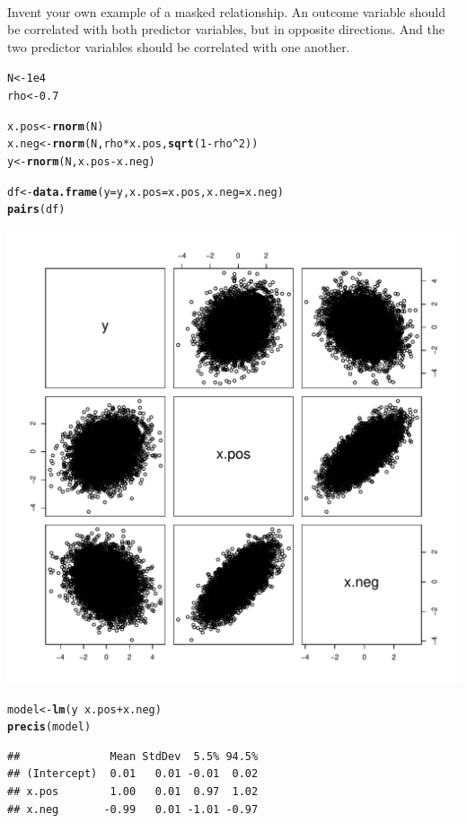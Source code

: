 \documentclass[12pt]{article}\usepackage[]{graphicx}\usepackage[]{color}
\makeatletter
\def\maxwidth{ %
  \ifdim\Gin@nat@width>\linewidth
    \linewidth
  \else
    \Gin@nat@width
  \fi
}
\newcommand{\hlnum}[1]{\textcolor[rgb]{0.686,0.059,0.569}{#1}}%
\newcommand{\hlopt}[1]{\textcolor[rgb]{0,0,0}{#1}}%
\newcommand{\hlstd}[1]{\textcolor[rgb]{0.345,0.345,0.345}{#1}}%
\newcommand{\hlkwb}[1]{\textcolor[rgb]{0.69,0.353,0.396}{#1}}%
\newcommand{\hlkwc}[1]{\textcolor[rgb]{0.333,0.667,0.333}{#1}}%
\newcommand{\hlkwd}[1]{\textcolor[rgb]{0.737,0.353,0.396}{\textbf{#1}}}%
\newenvironment{kframe}{%
 \def\at@end@of@kframe{}%
 \ifinner\ifhmode%
  \def\at@end@of@kframe{\end{minipage}}%
  \begin{minipage}{\columnwidth}%
 \fi\fi%
 \def\FrameCommand##1{\hskip\@totalleftmargin \hskip-\fboxsep
 \colorbox{shadecolor}{##1}\hskip-\fboxsep
     \hskip-\linewidth \hskip-\@totalleftmargin \hskip\columnwidth}%
 \MakeFramed {\advance\hsize-\width
   \@totalleftmargin\z@ \linewidth\hsize
   \@setminipage}}%
 {\par\unskip\endMakeFramed%
 \at@end@of@kframe}
\newenvironment{knitrout}{}{} %
\newenvironment{problem}[2][Problem]{\begin{trivlist}
\item[\hskip \labelsep {\bfseries #1}\hskip \labelsep {\bfseries #2.}]}{\end{trivlist}}
\makeatother
\begin{document}
\begin{problem}{5M2}
\text{ }\\
Invent your own example of a masked relationship. An outcome variable should be correlated with both predictor variables, but in opposite directions. And the two predictor variables should be correlated with one another.
\end{problem}

\begin{knitrout}
\color{fgcolor}\begin{kframe}
\begin{alltt}
\hlstd{N} \hlkwb{<-} \hlnum{1e4}
\hlstd{rho} \hlkwb{<-} \hlnum{0.7}

\hlstd{x.pos} \hlkwb{<-} \hlkwd{rnorm}\hlstd{(N)}
\hlstd{x.neg} \hlkwb{<-} \hlkwd{rnorm}\hlstd{(N, rho}\hlopt{*}\hlstd{x.pos,} \hlkwd{sqrt}\hlstd{(}\hlnum{1}\hlopt{-}\hlstd{rho}\hlopt{^}\hlnum{2}\hlstd{))}
\hlstd{y} \hlkwb{<-} \hlkwd{rnorm}\hlstd{(N, x.pos} \hlopt{-} \hlstd{x.neg)}

\hlstd{df} \hlkwb{<-} \hlkwd{data.frame}\hlstd{(}\hlkwc{y} \hlstd{= y,} \hlkwc{x.pos} \hlstd{= x.pos,} \hlkwc{x.neg} \hlstd{= x.neg)}
\hlkwd{pairs}\hlstd{(df)}
\end{alltt}
\end{kframe}
\includegraphics[width=\maxwidth]{figure/unnamed-chunk-3-1} 
\begin{kframe}\begin{alltt}
\hlstd{model} \hlkwb{<-} \hlkwd{lm}\hlstd{(y} \hlopt{~} \hlstd{x.pos} \hlopt{+} \hlstd{x.neg)}
\hlkwd{precis}\hlstd{(model)}
\end{alltt}
\begin{verbatim}
##              Mean StdDev  5.5% 94.5%
## (Intercept)  0.01   0.01 -0.01  0.02
## x.pos        1.00   0.01  0.97  1.02
## x.neg       -0.99   0.01 -1.01 -0.97
\end{verbatim}
\end{kframe}
\end{knitrout}
\end{document}
